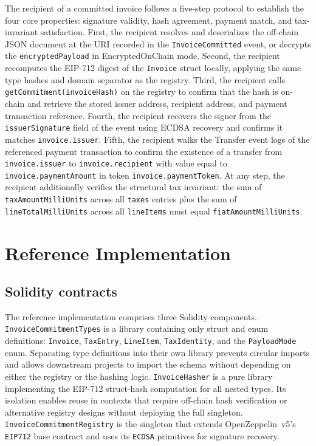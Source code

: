 \documentclass[11pt,a4paper]{article}
\begin{document}
The recipient of a committed invoice follows a five-step protocol to establish the four core properties: signature validity, hash agreement, payment match, and tax-invariant satisfaction. First, the recipient resolves and deserializes the off-chain JSON document at the URI recorded in the \texttt{InvoiceCommitted} event, or decrypts the \texttt{encryptedPayload} in EncryptedOnChain mode. Second, the recipient recomputes the EIP-712 digest of the \texttt{Invoice} struct locally, applying the same type hashes and domain separator as the registry. Third, the recipient calls \texttt{getCommitment(invoiceHash)} on the registry to confirm that the hash is on-chain and retrieve the stored issuer address, recipient address, and payment transaction reference. Fourth, the recipient recovers the signer from the \texttt{issuerSignature} field of the event using ECDSA recovery and confirms it matches \texttt{invoice.issuer}. Fifth, the recipient walks the Transfer event logs of the referenced payment transaction to confirm the existence of a transfer from \texttt{invoice.issuer} to \texttt{invoice.recipient} with value equal to \texttt{invoice.paymentAmount} in token \texttt{invoice.paymentToken}. At any step, the recipient additionally verifies the structural tax invariant: the sum of \texttt{taxAmountMilliUnits} across all \texttt{taxes} entries plus the sum of \texttt{lineTotalMilliUnits} across all \texttt{lineItems} must equal \texttt{fiatAmountMilliUnits}.

\section{Reference Implementation}
\label{sec:impl}

\subsection{Solidity contracts}

The reference implementation comprises three Solidity components. \texttt{InvoiceCommitmentTypes} is a library containing only struct and enum definitions: \texttt{Invoice}, \texttt{TaxEntry}, \texttt{LineItem}, \texttt{TaxIdentity}, and the \texttt{PayloadMode} enum. Separating type definitions into their own library prevents circular imports and allows downstream projects to import the schema without depending on either the registry or the hashing logic. \texttt{InvoiceHasher} is a pure library implementing the EIP-712 struct-hash computation for all nested types. Its isolation enables reuse in contexts that require off-chain hash verification or alternative registry designs without deploying the full singleton. \texttt{InvoiceCommitmentRegistry} is the singleton that extends OpenZeppelin~v5's \texttt{EIP712} base contract and uses its \texttt{ECDSA} primitives for signature recovery.
\end{document}
